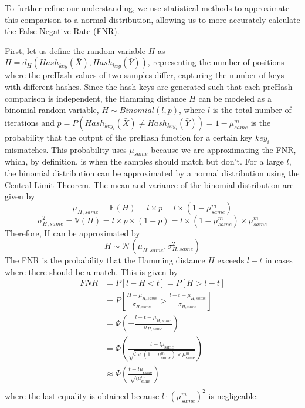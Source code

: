 To further refine our understanding, we use statistical methods to approximate this comparison to a normal distribution, allowing us to more accurately calculate the False Negative Rate (FNR). %


First, let us define the random variable $H$ as \(H = d_H(Hash_{key}(\bar{X}), Hash_{key}(\bar{Y}))\), representing the number of positions where the preHash values of two samples differ, capturing the number of keys with different hashes. Since the hash keys are generated such that each preHash comparison is independent, the Hamming distance $H$ can be modeled as a binomial random variable, \(H \sim Binomial(l, p)\), where $l$ is the total number of iterations and $p = P(Hash_{key_i}(\bar{X}) \neq Hash_{key_i}(\bar{Y})) = 1 - \mu_{same}^m$ is the probability that the output of the preHash function for a certain key $key_i$ mismatches. This probability uses $\mu_{same}$ because we are approximating the FNR, which, by definition, is when the samples should match but don't. 
\newline For a large $l$, the binomial distribution can be approximated by a normal distribution using the Central Limit Theorem. The mean and variance of the binomial distribution are given by
\[
\mu_{H, same} = \mathbb{E}(H) = l \times p = l \times (1 - \mu_{same}^m)    
\]
\[
\sigma_{H, same}^2 = \mathbb{V}(H) = l \times p \times (1 - p) = l \times (1 - \mu_{same}^m) \times \mu_{same}^m    
\]
Therefore, H can be approximated by
\[
H \sim \mathcal{N}(\mu_{H, same}, \sigma_{H, same}^2)    
\]
The FNR is the probability that the Hamming distance $H$ exceeds $l - t$ in cases where there should be a match. This is given by
\begin{equation}
    \begin{aligned}
        \label{eq:fnr}
        FNR &= P[l - H < t] = P[H > l - t] \\
        &= P\left[\frac{H - \mu_{H, same}}{\sigma_{H, same}} > \frac{l - t - \mu_{H, same}}{\sigma_{H, same}}\right] \\
        &= \Phi \left( - \frac{l - t - \mu_{H, same}}{\sigma_{H, same}}\right) \\
        &= \Phi \left(\frac{t - l\mu_{\text{same}}}{\sqrt{l \times (1 - \mu_{same}^m) \times \mu_{\text{same}}^m}}\right) \\
        &\approx \Phi \left(\frac{t - l\mu_{\text{same}}}{\sqrt{l\mu_{\text{same}}^m}}\right) \\
    \end{aligned}        
\end{equation}
where the last equality is obtained because $l\cdot(\mu_{same}^m)^2$ is negligeable. 

